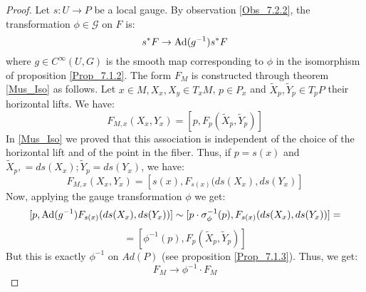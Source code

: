 \documentclass[12pt,a4paper]{report}
\theoremstyle{definition}
\theoremstyle{Theorem}
\theoremstyle{definition}
\theoremstyle{definition}
\begin{document}
	\begin{proof}
		Let $s:U\rightarrow P$ be a local gauge. By observation \ref{Obs_7.2.2}, the transformation $\phi\in\mathcal{G}$ on $F$ is:
		$$s^*F\rightarrow \hbox{Ad}(g^{-1})s^*F$$
		where $g\in C^\infty(U,G)$ is the smooth map corresponding to $\phi$ in the isomorphism of proposition \ref{Prop_7.1.2}. The form $F_M$ is constructed through theorem \ref{Mus_Iso} as follows. Let $x\in M,X_x,X_y\in T_xM$, $p\in P_x$ and $\tilde{X}_p,\tilde{Y}_p\in T_pP$ their horizontal lifts. We have:
		$$F_{M,x}(X_x,Y_x)=[p,F_p(\tilde{X}_p,\tilde{Y}_p)]$$
		In \ref{Mus_Iso} we proved that this association is independent of the choice of the horizontal lift and of the point in the fiber. Thus, if $p=s(x)$ and $\tilde{X}_p,=ds(X_x);\tilde{Y}_p=ds(Y_x)$, we have:
		$$F_{M,x}(X_x,Y_x)=[s(x),F_{s(x)}(ds(X_x),ds(Y_x)]$$
		Now, applying the gauge transformation $\phi$ we get:
		$$[p,\hbox{Ad}(g^{-1})F_{s(x)}(ds(X_x),ds(Y_x))]\sim [p\cdot \sigma^{-1}_\phi(p),F_{s(x)}(ds(X_x),ds(Y_x))]=$$
		$$=[\phi^{-1}(p),F_p(\tilde{X}_p,\tilde{Y}_p)]$$
		But this is exactly $\phi^{-1}$ on $Ad(P)$ (see proposition \ref{Prop_7.1.3}). Thus, we get:
		$$F_M\rightarrow \phi^{-1}\cdot F_M$$
	\end{proof}
\end{document}
